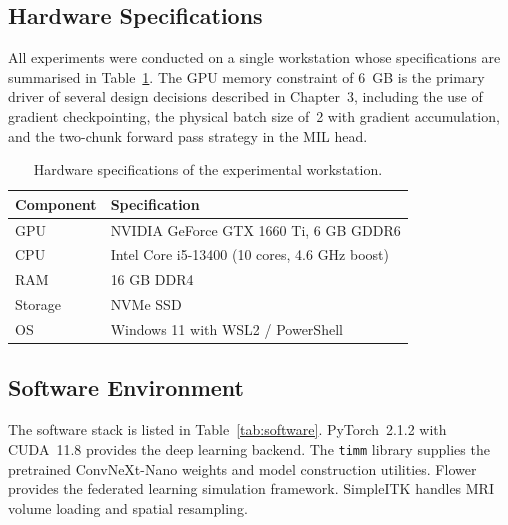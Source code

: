 \subsection{Hardware Specifications}
\label{sec:hardware-specs}

All experiments were conducted on a single workstation whose
specifications are summarised in Table~\ref{tab:hardware}.
The GPU memory constraint of 6~GB is the primary driver of
several design decisions described in Chapter~3, including the
use of gradient checkpointing, the physical batch size of~2
with gradient accumulation, and the two-chunk forward pass
strategy in the MIL head.

\begin{table}[htbp]
  \centering
  \caption{Hardware specifications of the experimental workstation.}
  \label{tab:hardware}
  \renewcommand{\arraystretch}{1.3}
  \begin{tabular}{ll}
    \toprule
    \textbf{Component} & \textbf{Specification} \\
    \midrule
    GPU   & NVIDIA GeForce GTX 1660 Ti, 6 GB GDDR6 \\
    CPU   & Intel Core i5-13400 (10 cores, 4.6 GHz boost) \\
    RAM   & 16 GB DDR4 \\
    Storage & NVMe SSD \\
    OS    & Windows 11 with WSL2 / PowerShell \\
    \bottomrule
  \end{tabular}
\end{table}

\subsection{Software Environment}
\label{sec:software-env}

The software stack is listed in Table~\ref{tab:software}.
PyTorch~2.1.2 with CUDA~11.8 provides the deep learning
backend.
The \texttt{timm} library supplies the pretrained
ConvNeXt-Nano weights and model construction utilities.
Flower provides the federated learning simulation framework.
SimpleITK handles MRI volume loading and spatial resampling.

